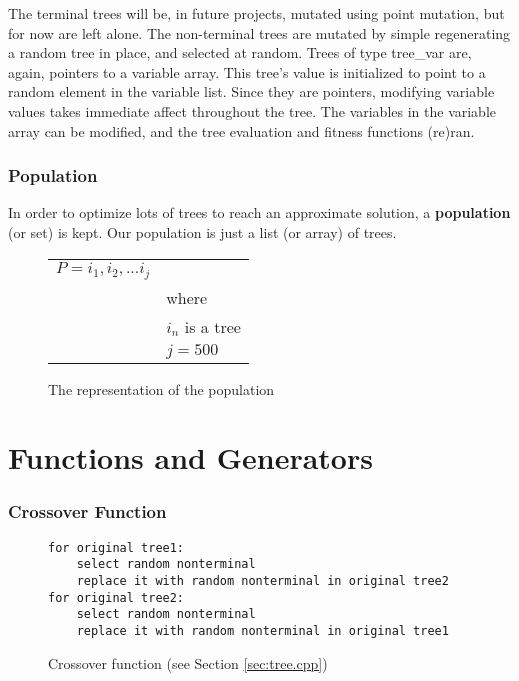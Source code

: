 \documentclass[12pt]{article}
\begin{document}
The terminal trees will be, in future projects, mutated using point mutation, but for now are left alone. The non-terminal trees are mutated by simple regenerating a random tree in place, and selected at random. Trees of type tree\_var are, again, pointers to a variable array. This tree's value is initialized to point to a random element in the variable list. Since they are pointers, modifying variable values takes immediate affect throughout the tree. The variables in the variable array can be modified, and the tree evaluation and fitness functions (re)ran. 

\section{Population}
\label{sec:population}
In order to optimize lots of trees to reach an approximate solution, a \textbf{population} (or set) is kept. Our population is just a list (or array) of trees. 

\begin{figure}[!h]
        \begin{center}
		\begin{tabular}{r l}
	                $ P = i_1, i_2, ... i_j $	& \\
								& where \\
								& $ i_n $ is a tree\\
								& $ j = 500 $ \\
		\end{tabular} 
               \caption{The representation of the population}
                \label{population}
        \end{center}
\end{figure}


\part{Functions and Generators}
\section{Crossover Function}
\begin{figure}[!h]
        \begin{center}
		\begin{lstlisting}
for original tree1:
	select random nonterminal
	replace it with random nonterminal in original tree2
for original tree2:
	select random nonterminal
	replace it with random nonterminal in original tree1
		\end{lstlisting}
               \caption{Crossover function (see Section \ref{sec:tree.cpp})}
                \label{fit_func}
        \end{center}
\end{figure}
\end{document}
